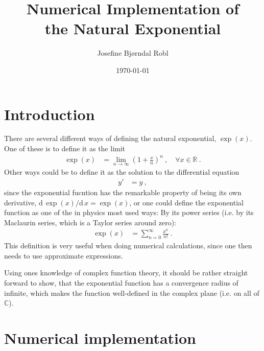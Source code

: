 \documentclass[a4paper,12pt,amsmath,amssymb,aps]{article}
\title{
	Numerical Implementation of\\
	the Natural Exponential
}
\author{Josefine Bjørndal Robl}
\date{\today}
\begin{document}
\maketitle




\section*{Introduction}

There are several different ways of defining the natural exponential, $\exp(x)$. One of these is to define it as the limit
\begin{align}
	\exp(x) &= \lim_{n \to \infty} \left( 1 + \frac{x}{n} \right)^n \: , \quad \forall x \in \mathbb{R} \: .
\end{align}
Other ways could be to define it as the solution to the differential equation
\begin{align}
	y' &= y \: ,
\end{align}
since the exponential fucntion has the remarkable property of being its own derivative, $\text{d}\, \exp(x) / \text{d}\,x = \exp(x)$, or one could define the exponential function as one of the in physics most used ways: By its power series (i.e. by its Maclaurin series, which is a Taylor series around zero):
\begin{align} \label{eq:expAsTaylorSeries}
	\exp(x) &= \sum_{n = 0}^\infty \frac{x^n}{n!} \: .
\end{align}
This definition is very useful when doing numerical calculations, since one then needs to use approximate expressions.

Using ones knowledge of complex function theory, it should be rather straight forward to show, that the exponential function has a convergence radius of infinite, which makes the function well-defined in the complex plane (i.e. on all of $\mathbb{C}$).


\section*{Numerical implementation}
\end{document}
